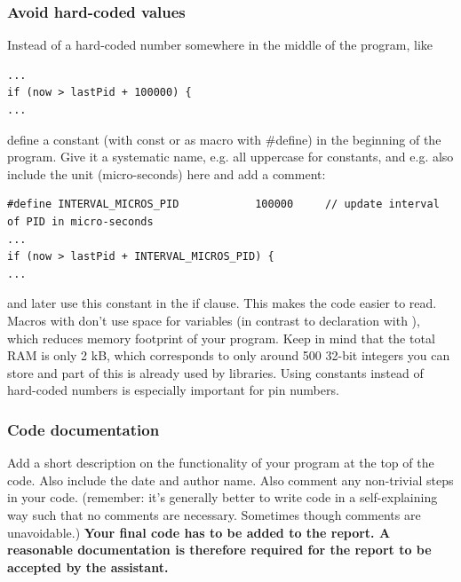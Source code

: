\subsubsection{Avoid hard-coded values}
Instead of a hard-coded number somewhere in the middle of the program, like \newline
\noindent\begin{minipage}{\textwidth}
\begin{lstlisting}[language=Arduino]
...
if (now > lastPid + 100000) {
...
\end{lstlisting}
\end{minipage}
define a constant (with const or as macro with \#define) in the beginning of the program. Give it a systematic name, e.g. all uppercase for constants, and e.g. also include the unit (micro-seconds) here and add a comment: \newline
\noindent\begin{minipage}{\textwidth}
\begin{lstlisting}[language=Arduino]
#define INTERVAL_MICROS_PID            100000     // update interval of PID in micro-seconds
...
if (now > lastPid + INTERVAL_MICROS_PID) {
...
\end{lstlisting}
\end{minipage}
and later use this constant  in the if clause. This makes the code easier to read. Macros with  don't use space for variables (in contrast to declaration with ), which reduces memory footprint of your program. Keep in mind that the total RAM is only 2 kB, which corresponds to only around 500 32-bit integers you can store and part of this is already used by libraries. Using constants instead of hard-coded numbers is especially important for pin numbers.


\subsubsection{Code documentation}
Add a short description on the functionality of your program at the top of the code. Also include the date and author name. Also comment any non-trivial steps in your code. (remember: it's generally better to write code in a self-explaining way such that no comments are necessary. Sometimes though comments are unavoidable.) \newline
\textbf{Your final code has to be added to the report. A reasonable documentation is therefore required for the report to be accepted by the assistant.}


